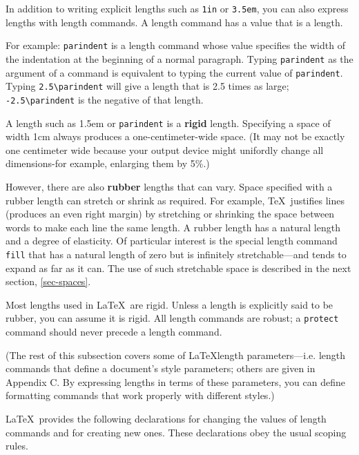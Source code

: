 \documentclass{article}
\begin{document}
In addition to writing explicit lengths such as {\tt 1in} or {\tt 3.5em}, you can also express
lengths with length commands. A length command has a value that is a length. 

For example: \verb:parindent: is a length command whose value specifies the width of the indentation
at the beginning of a normal paragraph. Typing \verb:parindent: as the argument of a command is
equivalent to typing the current value of \verb:parindent:. Typing \verb:2.5\parindent: will give a
length that is 2.5 times as large; \verb:-2.5\parindent: is the negative of that length.

A length such as 1.5em or \verb:parindent: is a \textbf{rigid} length. Specifying a space of width
1cm always produces a one-centimeter-wide space. (It may not be exactly one centimeter wide because
your output device might unifordly change all dimensions-for example, enlarging them by 5\%.) 

However, there are also \textbf{rubber} lengths that can vary. Space specified with a rubber length
can stretch or shrink as required. For example, \TeX\ justifies lines (produces an even right
margin) by stretching or shrinking the space between words to make each line the same length. A
rubber length has a natural length and a degree of elasticity. Of particular interest is the
special length command \verb:fill: that has a natural length of zero but is infinitely
stretchable---and tends to expand as far as it can. The use of such stretchable space is described
in the next section, \ref{sec-spaces}.

Most lengths used in \LaTeX\ are rigid. Unless a length is explicitly said to be rubber, you can
assume it is rigid. All length commands are robust; a \verb:protect: command should never precede a
length command.

(The rest of this subsection covers some of \LaTeX length parameters---i.e. length commands that
define a document's style parameters; others are given in Appendix C. By expressing lengths in
terms of these parameters, you can define formatting commands that work properly with different
styles.)

\LaTeX\ provides the following declarations for changing the values of length commands and for
 creating new ones. These declarations obey the usual scoping rules.
\end{document}
